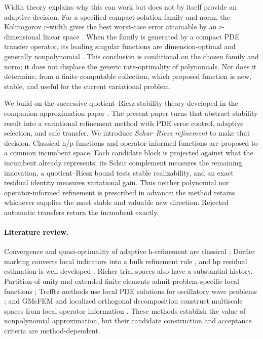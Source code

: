 \documentclass[11pt]{article}
\numberwithin{algorithm}{section}
\theoremstyle{definition}\newtheorem{definition}[theorem]{Definition}
\theoremstyle{remark}\newtheorem{remark}[theorem]{Remark}
\begin{document}
Width theory explains why this can work but does not by itself provide an
adaptive decision.  For a specified compact solution family and norm, the
Kolmogorov $r$-width gives the best worst-case error attainable by an
$r$-dimensional linear space \cite{kolmogorov1936,pinkus1985}.  When the
family is generated by a compact PDE transfer operator, its leading singular
functions are dimension-optimal and generally nonpolynomial
\cite{babuskalipton2011}.  This conclusion is conditional on the chosen
family and norm; it does not displace the generic rate-optimality of
polynomials.  Nor does it determine, from a finite computable collection,
which proposed function is new, stable, and useful for the current
variational problem.

We build on the successive quotient--Riesz stability theory developed in the
companion approximation paper \cite{dixon2026schurriesz}.  The present paper
turns that abstract stability result into a variational refinement method with
PDE error control, adaptive selection, and safe transfer.  We introduce
\emph{Schur--Riesz refinement} to make that decision.  Classical
h/p functions and operator-informed functions are proposed to a common
incumbent space.  Each candidate block is projected against what the
incumbent already represents; its Schur complement measures the remaining
innovation, a quotient--Riesz bound tests stable realizability, and an exact
residual identity measures variational gain.  Thus neither polynomial nor
operator-informed refinement is prescribed in advance: the method retains
whichever supplies the most stable and valuable new direction.  Rejected
automatic transfers return the incumbent exactly.

\paragraph{Literature review.}
Convergence and quasi-optimality of adaptive h-refinement are classical
\cite{binevdahmendevore2004,casconetal2008}; D\"orfler marking converts local
indicators into a bulk refinement rule \cite{dorfler1996}, and hp residual
estimation is well developed \cite{melenkwohlmuth2001}.  Richer trial spaces
also have a substantial history.  Partition-of-unity and extended finite
elements admit problem-specific local functions
\cite{belytschkoblack1999,babuskamelenk1997}; Trefftz methods use local PDE
solutions for oscillatory wave problems \cite{hiptmairmoiolaperugia2016}; and
GMsFEM and localized orthogonal decomposition construct multiscale spaces from
local operator information \cite{efendievgalvishou2013,malqvistpeterseim2014}.
These methods establish the value of nonpolynomial approximation, but their
candidate construction and acceptance criteria are method-dependent.
\end{document}

